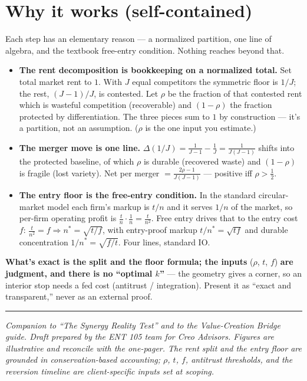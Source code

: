 \documentclass[11pt]{article}
\begin{document}
\section{Why it works (self-contained)}
Each step has an elementary reason --- a normalized partition, one line of algebra, and the
textbook free-entry condition. Nothing reaches beyond that.
\begin{itemize}
  \item \textbf{The rent decomposition is bookkeeping on a normalized total.} Set total market
  rent to $1$. With $J$ equal competitors the symmetric floor is $1/J$; the rest, $(J-1)/J$, is
  contested. Let $\rho$ be the fraction of that contested rent which is wasteful competition
  (recoverable) and $(1-\rho)$ the fraction protected by differentiation. The three pieces sum to
  $1$ by construction --- it's a partition, not an assumption. ($\rho$ is the one input you
  estimate.)
  \item \textbf{The merger move is one line.} $\Delta(1/J)=\tfrac{1}{J-1}-\tfrac1J=\tfrac{1}{J(J-1)}$
  shifts into the protected baseline, of which $\rho$ is durable (recovered waste) and $(1-\rho)$
  is fragile (lost variety). Net per merger $=\tfrac{2\rho-1}{J(J-1)}$ --- positive iff
  $\rho>\tfrac12$.
  \item \textbf{The entry floor is the free-entry condition.} In the standard circular-market
  model each firm's markup is $t/n$ and it serves $1/n$ of the market, so per-firm operating
  profit is $\tfrac{t}{n}\cdot\tfrac1n=\tfrac{t}{n^2}$. Free entry drives that to the entry cost
  $f$: $\tfrac{t}{n^2}=f\Rightarrow n^{*}=\sqrt{t/f}$, with entry-proof markup $t/n^{*}=\sqrt{tf}$
  and durable concentration $1/n^{*}=\sqrt{f/t}$. Four lines, standard IO.
\end{itemize}
\textbf{What's exact is the split and the floor formula; the inputs} ($\rho$, $t$, $f$)
\textbf{are judgment, and there is no ``optimal $k$''} --- the geometry gives a corner, so an
interior stop needs a fed cost (antitrust / integration). Present it as ``exact and
transparent,'' never as an external proof.

\vspace{6pt}\hrule\vspace{5pt}
{\footnotesize\itshape Companion to ``The Synergy Reality Test'' and to the Value-Creation
Bridge guide. Draft prepared by the ENT 105 team for Creo Advisors. Figures are illustrative
and reconcile with the one-pager. The rent split and the entry floor are grounded in
conservation-based accounting; $\rho$, $t$, $f$,
antitrust thresholds, and the reversion timeline are client-specific inputs set at scoping.}
\end{document}

